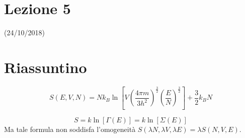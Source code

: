 \documentclass[12pt]{article}
\begin{document}
\section{Lezione 5}
\vspace{-1em}
\begin{center}
    \small{(24/10/2018)}
\end{center}
\section{Riassuntino}
\begin{equation}
S(E,V,N) = Nk_B \ln\left[V\left(\frac{4\pi m}{3h^2}\right)^\frac{3}{2}\left(\frac{E}{N}\right)^\frac{3}{2}\right]+\frac{3}{2}k_B N
\label{eqn:entropianonestensiva}
\end{equation}

\begin{equation}
S=k\ln\left[\Gamma(E)\right] = k\ln[\Sigma(E)]
\end{equation}
Ma tale formula non soddisfa l'omogeneità $S(\lambda N, \lambda V, \lambda E)=\lambda S(N,V,E)$.\\
\end{document}

